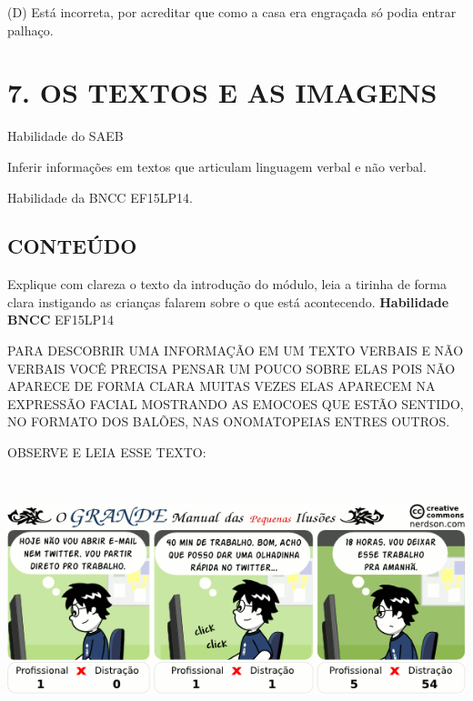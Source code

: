 (D) Está incorreta, por acreditar que como a casa era engraçada só podia
entrar palhaço.

\section{7. OS TEXTOS E AS
IMAGENS}\label{muxf3dulo-7-os-textos-e-as-imagens}

\protect\hypertarget{_heading=h.3c1jaqhv8nr}{}{}

\protect\hypertarget{_heading=h.kyrxefm3laa1}{}{}Habilidade do SAEB

\protect\hypertarget{_heading=h.er3p7jk5yewm}{}{}Inferir informações em textos que articulam linguagem verbal e não verbal.

\protect\hypertarget{_heading=h.69rmtrb8c7jb}{}{}

\protect\hypertarget{_heading=h.23ckvvd}{}{}Habilidade da BNCC
EF15LP14.

\subsection{CONTEÚDO}\label{conteuxfado-6}

Explique com clareza o texto da introdução do módulo, leia a tirinha de
forma clara instigando as crianças falarem sobre o que está acontecendo.
\textbf{Habilidade BNCC} EF15LP14

PARA DESCOBRIR UMA INFORMAÇÃO EM UM TEXTO VERBAIS E NÃO VERBAIS VOCÊ
PRECISA PENSAR UM POUCO SOBRE ELAS POIS NÃO APARECE DE FORMA CLARA
MUITAS VEZES ELAS APARECEM NA EXPRESSÃO FACIAL MOSTRANDO AS EMOCOES QUE
ESTÃO SENTIDO, NO FORMATO DOS BALÕES, NAS ONOMATOPEIAS ENTRES OUTROS.

OBSERVE E LEIA ESSE TEXTO:
\includegraphics[width=6.51667in,height=3.14097in]{media/image170.png}

